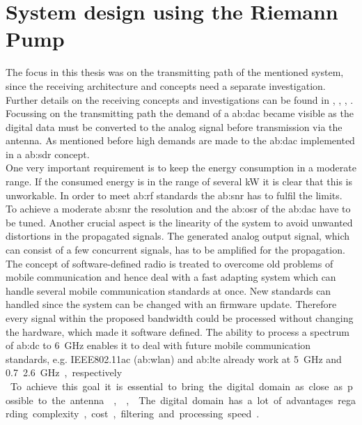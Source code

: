 \section{System design using the Riemann Pump} %
The focus in this thesis was on the transmitting path of the mentioned system, since the receiving architecture and concepts need a separate investigation.
Further details on the receiving concepts and investigations can be found in \citep{RivetFadhuileDevalEtAl2013}, \cite{RivetDevalD.2008}, \cite{RivetF.2014}, \cite{RivetDevalBegueretJ.-B.2007}.
Focussing on the transmitting path the demand of a \gls{ab:dac} became visible as the digital data must be converted to the analog signal before transmission via the antenna.
As mentioned before high demands are made to the \gls{ab:dac} implemented in a \gls{ab:sdr} concept.\\
One very important requirement is to keep the energy consumption in a moderate range.
If the consumed energy is in the range of several \si{\kilo \watt} it is clear that this is unworkable.
In order to meet \gls{ab:rf} standards the \gls{ab:snr} has to fulfil the limits.
To achieve a moderate \gls{ab:snr} the resolution and the \gls{ab:osr} of the \gls{ab:dac} have to be tuned.
Another crucial aspect is the linearity of the system to avoid unwanted distortions in the propagated signals.
The generated analog output signal, which can consist of a few concurrent signals, has to be amplified for the propagation.\\
The concept of software-defined radio is treated to overcome old problems of mobile communication and hence deal with a fast adapting system which can handle several mobile communication standards at once.
New standards can handled since the system can be changed with an firmware update. 
Therefore every signal within the proposed bandwidth could be processed without changing the hardware, which made it software defined.
The ability to process a spectrum of \gls{ab:dc} to \SI{6}{\giga \hertz} enables it to deal with future mobile communication standards, e.g. IEEE802.11ac (\gls{ab:wlan}) and \gls{ab:lte} already work at \SI{5}{\giga \hertz} and \SI{0.7} ... \SI{2.6}{\giga \hertz}, respectively.\\
To achieve this goal it is essential to bring the digital domain as close as possible to the antenna \cite{RivetDevalBegueretJ.-B.2007}, \cite{DevalRivetVeyracEtAl2013},\cite{RivetDevalJ.-B.EtAl2010}.
The digital domain has a lot of advantages regarding complexity, cost, filtering and processing speed \cite{Grossman2005}.
